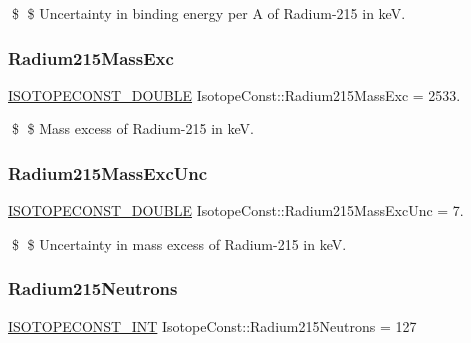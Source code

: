 \$ \$ Uncertainty in binding energy per A of Radium-\/215 in keV. \mbox{\label{group___isotope_const-_radium-_ra215_ga44ddd6a6f508b1a00e45c3d565f3cce7}} 
\subsubsection{\texorpdfstring{Radium215\+Mass\+Exc}{Radium215MassExc}}
{\footnotesize\ttfamily \mbox{\hyperlink{group___isotope_const-_macros_ga8f45a7272ce02c0b4c65c44636ed719a}{I\+S\+O\+T\+O\+P\+E\+C\+O\+N\+S\+T\+\_\+\+D\+O\+U\+B\+LE}} Isotope\+Const\+::\+Radium215\+Mass\+Exc = 2533.}

\$ \$ Mass excess of Radium-\/215 in keV. \mbox{\label{group___isotope_const-_radium-_ra215_ga7d5d9148d9adaf183bb515491310cf92}} 
\subsubsection{\texorpdfstring{Radium215\+Mass\+Exc\+Unc}{Radium215MassExcUnc}}
{\footnotesize\ttfamily \mbox{\hyperlink{group___isotope_const-_macros_ga8f45a7272ce02c0b4c65c44636ed719a}{I\+S\+O\+T\+O\+P\+E\+C\+O\+N\+S\+T\+\_\+\+D\+O\+U\+B\+LE}} Isotope\+Const\+::\+Radium215\+Mass\+Exc\+Unc = 7.}

\$ \$ Uncertainty in mass excess of Radium-\/215 in keV. \mbox{\label{group___isotope_const-_radium-_ra215_ga143b2df36697746af41dff3c70593a70}} 
\subsubsection{\texorpdfstring{Radium215\+Neutrons}{Radium215Neutrons}}
{\footnotesize\ttfamily \mbox{\hyperlink{group___isotope_const-_macros_ga5f18360b3e99483a35c32d789e62621c}{I\+S\+O\+T\+O\+P\+E\+C\+O\+N\+S\+T\+\_\+\+I\+NT}} Isotope\+Const\+::\+Radium215\+Neutrons = 127}

